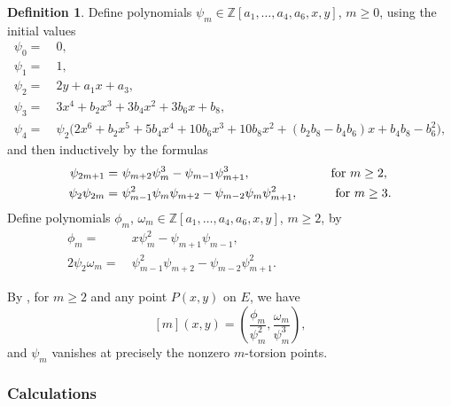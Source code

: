 \documentclass{gtpart}
\theoremstyle{definition}
\newtheorem{defn}[thm]{Definition}
\theoremstyle{remark}
\newcommand{\mb}[1]{\mathbb{#1}}
\newcommand{\BZ}{{\mb Z}}
\numberwithin{equation}{section}
\numberwithin{thm}{section}
\begin{document}
\begin{defn}
\label{def:division}
 Define polynomials $\psi_m \in \BZ[a_1,\ldots,a_4,a_6,x,y]$, $m \geq 0$, 
 using the initial values 
 \begin{equation*}
 \begin{split}
  \psi_0 = & ~ 0, \\
  \psi_1 = & ~ 1, \\
  \psi_2 = & ~ 2 y + a_1 x + a_3, \\
  \psi_3 = & ~ 3 x^4 + b_2 x^3 + 3 b_4 x^2 + 3 b_6 x + b_8, \\
  \psi_4 = & ~ \psi_2 \big( 2 x^6 + b_2 x^5 + 5 b_4 x^4 + 10 b_6 x^3 + 10 b_8 x^2 + (b_2 b_8 - b_4 b_6) x + b_4 b_8 - b_6^2 \big), 
 \end{split}
 \end{equation*}
 and then inductively by the formulas 
 \begin{equation*}
 \begin{split}
       \psi_{2m+1} = & ~ \psi_{m+2} \psi_m^3 - \psi_{m-1} \psi_{m+1}^3, \qquad \qquad \qquad ~\thinspace {\rm for} ~ m \geq 2, \\
  \psi_2 \psi_{2m} = & ~ \psi_{m-1}^2 \psi_m \psi_{m+2} - \psi_{m-2} \psi_m \psi_{m+1}^2, \qquad \quad {\rm for} ~ m \geq 3.  
 \end{split}
 \end{equation*}
 Define polynomials $\phi_m$, $\omega_m \in \BZ[a_1,\ldots,a_4,a_6,x,y]$, 
 $m \geq 2$, by 
 \begin{equation*}
 \begin{split}
             \phi_m = & ~ x \psi_m^2 - \psi_{m+1} \psi_{m-1}, \\
  2 \psi_2 \omega_m = & ~ \psi_{m-1}^2 \psi_{m+2} - \psi_{m-2} \psi_{m+1}^2.  \qquad \qquad \qquad \qquad \quad ~~
 \end{split}
 \end{equation*}
\end{defn}

By \cite[Exercise 3.7d and f]{AEC}, for $m \geq 2$ and any point 
$P(x,y)$ on $E$, we have 
\begin{equation}
\label{[m]}
 [m] (x,y) = \left( \frac{\phi_m}{\psi_m^2}, 
 \frac{\omega_m}{\psi_m^3} \right), 
\end{equation}
and $\psi_m$ vanishes at precisely the nonzero $m$-torsion points.  

\subsubsection*{Calculations}
\end{document}
